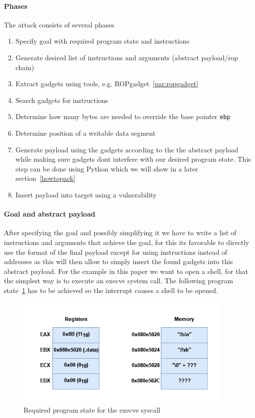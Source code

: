 \documentclass[journal=tosc,submission, notanonymous]{iacrtrans}
\begin{document}
\paragraph{Phases}
The attack consists of several phases
\begin{enumerate}
  \item Specify goal with required program state and instructions
  \item Generate desired list of instructions and arguments (abstract payload/rop chain)
  \item Extract gadgets using tools, e.g. ROPgadget~\cref{par:ropgadget}
  \item Search gadgets for instructions
  \item Determine how many bytes are needed to override the base pointer \Verb+ebp+
  \item Determine position of a writable data segment
  \item Generate payload using the gadgets according to the the abstract payload while making sure gadgets dont interfere with our desired program state. This step can be done using Python which we will show in a later section~\cref{howtopack}
  \item Insert payload into target using a vulnerability
\end{enumerate}
\paragraph{Goal and abstract payload}
After specifying the goal and possibly simplifying it we have to write a list of instructions and arguments that achieve the goal, for this its favorable to directly use the format of the final payload except for using instructions instead of addresses as this will then allow to simply insert the found gadgets into this abstract payload. For the example in this paper we want to open a shell, for that the simplest way is to execute an execve system call. The following program state~\cref{fig:stateforint} has to be achieved so the interrupt  causes a shell to be opened.
\begin{figure}[h]
  \centering
  \includegraphics[width=0.95\textwidth]{Stateforexecve.png}
  \caption{Required program state for the execve syscall}
  \label{fig:stateforint}
\end{figure}
\end{document}

